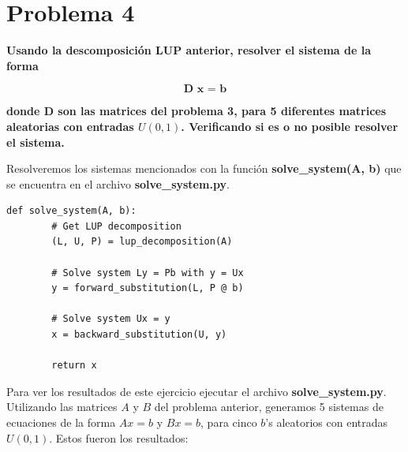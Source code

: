 \documentclass[12pt,letterpaper]{article}
\begin{document}
\section*{Problema 4}

\textbf{Usando la descomposici\'on LUP anterior, resolver el sistema de la forma}

\begin{equation*}
\textbf{D x = b}
\end{equation*}

\textbf{donde D son las matrices del problema 3, para 5 diferentes matrices aleatorias con entradas $U(0,1)$. Verificando si es o no posible resolver el sistema.}

Resolveremos los sistemas mencionados con la funci\'on \textbf{solve\_system(A, b)} que se encuentra en el archivo \textbf{solve\_system.py}.
    \begin{lstlisting}[style = Python]
    def solve_system(A, b):
        # Get LUP decomposition
        (L, U, P) = lup_decomposition(A)
    
        # Solve system Ly = Pb with y = Ux
        y = forward_substitution(L, P @ b)
    
        # Solve system Ux = y
        x = backward_substitution(U, y)
    
        return x
    \end{lstlisting}
    
Para ver los resultados de este ejercicio ejecutar el archivo \textbf{solve\_system.py}.\\

Utilizando las matrices $A$ y $B$ del problema anterior, generamos 5 sistemas de ecuaciones de la forma $Ax = b $ y $Bx = b$, para cinco $b$'s aleatorios con entradas $U(0,1)$. Estos fueron los resultados:
\end{document}
